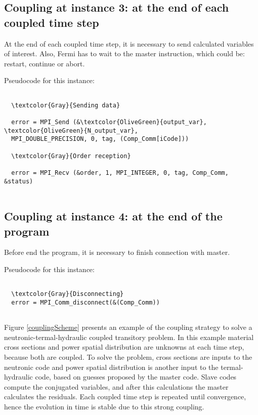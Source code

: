 \subsection*{Coupling at instance 3: at the end of each coupled time step}

At the end of each coupled time step, it is necessary to send calculated variables of interest.
Also, Fermi has to wait to the master instruction, which could be: restart, continue or abort.

Pseudocode for this instance:

\begin{Verbatim}[frame=single,commandchars=\\\{\}]

  \textcolor{Gray}{Sending data}

  error = MPI_Send (&\textcolor{OliveGreen}{output_var}, \textcolor{OliveGreen}{N_output_var}, 
  MPI_DOUBLE_PRECISION, 0, tag, (Comp_Comm[iCode]))
  
  \textcolor{Gray}{Order reception}
  
  error = MPI_Recv (&order, 1, MPI_INTEGER, 0, tag, Comp_Comm, &status)


\end{Verbatim}


\subsection*{Coupling at instance 4: at the end of the program}

Before end the program, it is necessary to finish connection with master.

Pseudocode for this instance:

\begin{Verbatim}[frame=single,commandchars=\\\{\}]

  \textcolor{Gray}{Disconnecting}
  error = MPI_Comm_disconnect(&(Comp_Comm))
  
\end{Verbatim}

Figure \ref{couplingScheme} presents an example of the coupling strategy to solve a neutronic-termal-hydraulic coupled transitory problem.
In this example material cross sections and power spatial distribution are unknowns at each time step, because both are coupled.
To solve the problem, cross sections are inputs to the neutronic code and power spatial distribution is another input to the termal-hydraulic code,
based on guesses proposed by the master code.
Slave codes compute the conjugated variables, and after this calculations the master calculates the residuals.
Each coupled time step is repeated until convergence, hence the evolution in time is stable due to this strong coupling.


